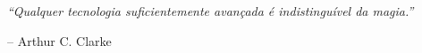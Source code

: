 %


\newpage
\thispagestyle{empty}

\vspace*{\fill}

\begin{flushright}
    \begin{minipage}{0.6\textwidth}
        \begin{flushright}
            \textit{``Qualquer tecnologia suficientemente avançada é indistinguível da magia.''}

            \vspace{0.5cm}

            -- Arthur C. Clarke
        \end{flushright}
    \end{minipage}
\end{flushright}

\vspace{3cm}

\cleardoublepage
